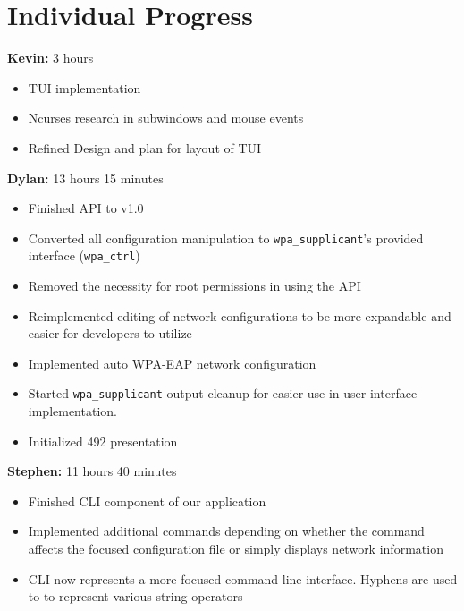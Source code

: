 \documentclass[11pt]{article}
\begin{document}
\newpage
\section{Individual Progress}

\textbf{Kevin:} 3 hours
\begin{itemize}
  \item TUI implementation
  \item Ncurses research in subwindows and mouse events
  \item Refined Design and plan for layout of TUI
\end{itemize}

\textbf{Dylan:} 13 hours 15 minutes
\begin{itemize}
  \item Finished API to v1.0
  \item Converted all configuration manipulation to \texttt{wpa\_supplicant}'s
    provided interface (\texttt{wpa\_ctrl})
  \item Removed the necessity for root permissions in using the API
  \item Reimplemented editing of network configurations to be more expandable
    and easier for developers to utilize
  \item Implemented auto WPA-EAP network configuration
  \item Started \texttt{wpa\_supplicant} output cleanup for easier use in user
    interface implementation.
  \item Initialized 492 presentation
\end{itemize}

\textbf{Stephen:} 11 hours 40 minutes
\begin{itemize}
  \item Finished CLI component of our application
  \item Implemented additional commands depending on whether the command affects 
    the focused configuration file or simply displays network information 
  \item CLI now represents a more focused command line interface. Hyphens are 
    used to to represent various string operators 
\end{itemize}
\end{document}
